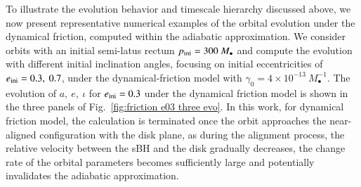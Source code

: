 \documentclass[aps,prx,reprint,superscriptaddress,nofootinbib,longbibliography]{revtex4-1}
\begin{document}
\par
To illustrate the evolution behavior and timescale hierarchy discussed above, we now present representative numerical examples of the orbital evolution under the dynamical friction, computed within the adiabatic approximation. We consider orbits with an initial semi-latus rectum $p_{\rm ini}=300\ M_{\bullet}$ and compute the evolution with different initial inclination angles, focusing on initial eccentricities of $e_{\rm ini}=0.3,\ 0.7$, under the dynamical-friction model with $\gamma_{0}=4\times 10^{-13}\ M_{\bullet}^{-1}$.
The evolution of $a,\ e,\ \iota$ for $e_{\rm ini}=0.3$ under the dynamical friction model is shown in the three panels of Fig.~\ref{fig:friction e03 three evo}. In this work, for dynamical friction model, the calculation is terminated once the orbit approaches the near-aligned configuration with the disk plane, as during the alignment process, the relative velocity between the sBH and the disk  gradually decreases, the change rate of the orbital parameters becomes sufficiently large and potentially invalidates the adiabatic approximation.
\end{document}
